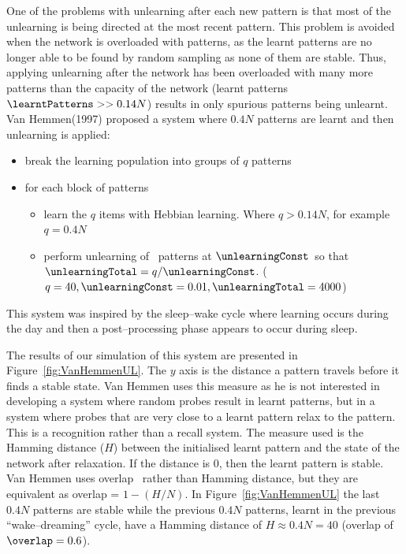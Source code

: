 One of the problems with unlearning after each new pattern is that most of the unlearning is being directed at the most recent pattern.  This problem is avoided when the network is overloaded with patterns, as the learnt patterns are no longer able to be found by random sampling as none of them are stable.  Thus, applying unlearning after the network has been overloaded with many more patterns than the capacity of the network (learnt patterns $\learntPatterns >> 0.14N$) results in only spurious patterns being unlearnt.  Van Hemmen(1997) proposed a system where $0.4N$ patterns are learnt and then unlearning is applied:
\begin{itemize}[topsep=1ex, leftmargin=1cm, labelsep=0.2cm, itemindent=0pt,label=\textbullet]
	\item break the learning population into groups of $q$ patterns
	\item for each block of patterns
	\begin{itemize}[topsep=1ex, leftmargin=1cm, labelsep=0.2cm, itemindent=0pt,label=\textbullet]
		\item learn the $q$ items with Hebbian learning. Where $q>0.14N$, for example $q=0.4N$
		\item perform unlearning of \unlearningTotal\ patterns at $\unlearningConst\,$ so that $\unlearningTotal = q/\unlearningConst$. ($q=40, \unlearningConst =0.01, \unlearningTotal=4000$)
	\end{itemize}
\end{itemize}
This system was inspired by the sleep--wake cycle where learning occurs during the day and then a post--processing phase appears to occur during sleep.

The results of our simulation of this system are presented in Figure~\ref{fig:VanHemmenUL}.  The $y$ axis is the distance a pattern travels before it finds a stable state.  Van Hemmen uses this measure as he is not interested in developing a system where random probes result in learnt patterns, but in a system where probes that are very close to a learnt pattern relax to the pattern.  This is a recognition rather than a recall system.  The measure used is the Hamming distance ($H$) between the initialised learnt pattern and the state of the network after relaxation. If the distance is $0$, then the learnt pattern is stable.  Van Hemmen uses overlap \overlap\ rather than Hamming distance, but they are equivalent as overlap \overlap = $1-(H/N)$.  In Figure~\ref{fig:VanHemmenUL} the last $0.4N$ patterns are stable while the previous $0.4N$ patterns, learnt in the previous ``wake--dreaming'' cycle, have a Hamming distance of $H \approx 0.4N = 40$ (overlap of $\overlap=0.6$).  

